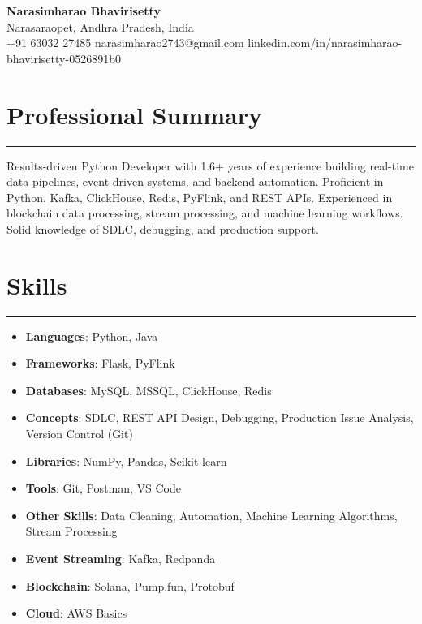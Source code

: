 \documentclass[12pt]{article}
\begin{document}
\begin{center}
  {\huge\textbf{Narasimharao Bhavirisetty}}\\[3pt]
  Narasaraopet, Andhra Pradesh, India \\[1pt]
  +91 63032 27485 \textbullet{} narasimharao2743@gmail.com \textbullet{}
  linkedin.com/in/narasimharao-bhavirisetty-0526891b0
\end{center}

\vspace{6pt}

\section*{Professional Summary}
\vspace{1pt}\hrule\vspace{4pt}
Results-driven Python Developer with 1.6+ years of experience building real-time data pipelines, event-driven systems, and backend automation. Proficient in Python, Kafka, ClickHouse, Redis, PyFlink, and REST APIs. Experienced in blockchain data processing, stream processing, and machine learning workflows. Solid knowledge of SDLC, debugging, and production support.

\section*{Skills}
\vspace{1pt}\hrule\vspace{4pt}
\begin{itemize}
  \item \textbf{Languages}: Python, Java
  \item \textbf{Frameworks}: Flask, PyFlink
  \item \textbf{Databases}: MySQL, MSSQL, ClickHouse, Redis
  \item \textbf{Concepts}: SDLC, REST API Design, Debugging, Production Issue Analysis, Version Control (Git)
  \item \textbf{Libraries}: NumPy, Pandas, Scikit-learn
  \item \textbf{Tools}: Git, Postman, VS Code
  \item \textbf{Other Skills}: Data Cleaning, Automation, Machine Learning Algorithms, Stream Processing
  \item \textbf{Event Streaming}: Kafka, Redpanda
  \item \textbf{Blockchain}: Solana, Pump.fun, Protobuf
  \item \textbf{Cloud}: AWS Basics
\end{itemize}
\end{document}
